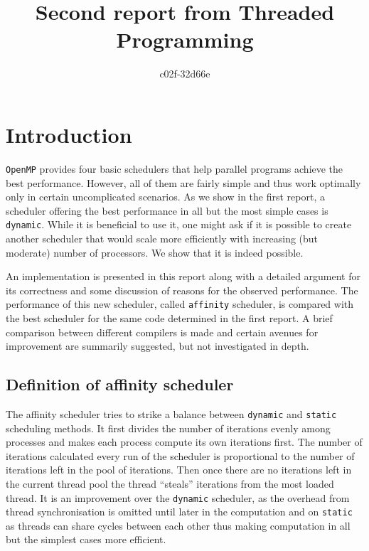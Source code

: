 \documentclass[11pt,a4paper]{article}
\begin{document}
\title{Second report from Threaded Programming}
\author{c02f-32d66e}
\maketitle

\section{Introduction}
\texttt{OpenMP} provides four basic schedulers that help parallel programs achieve the best performance. 
However, all of them are fairly simple and thus work optimally only in certain uncomplicated scenarios. 
As we show in the first report, a scheduler offering the best performance in all but the most simple cases is \texttt{dynamic}. 
While it is beneficial to use it, one might ask if it is possible to create another scheduler that would scale more efficiently with increasing (but moderate) number of processors. 
We show that it is indeed possible.

An implementation is presented in this report along with a detailed argument for its correctness and some discussion of reasons for the observed performance. The performance of this new scheduler, called \texttt{affinity} scheduler, is compared with the best scheduler for the same code determined in the first report. A brief comparison between different compilers is made and certain avenues for improvement are summarily suggested, but not investigated in depth.

\subsection{Definition of affinity scheduler}
The affinity scheduler tries to strike a balance between \texttt{dynamic} and \texttt{static} scheduling methods. 
It first divides the number of iterations evenly among processes and makes each process compute its own iterations first.
The number of iterations calculated every run of the scheduler is proportional to the number of iterations left in the pool of iterations.
Then once there are no iterations left in the current thread pool the thread ``steals'' iterations from the most loaded thread.
It is an improvement over the \texttt{dynamic} scheduler, as the overhead from thread synchronisation is omitted until later in the computation and on \texttt{static} as threads can share cycles between each other thus making computation in all but the simplest cases more efficient.
\end{document}
